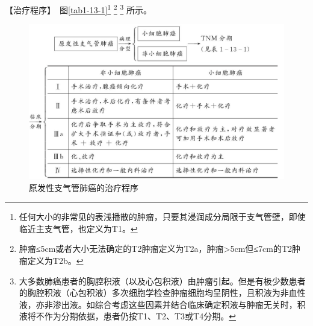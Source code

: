 【治疗程序】　图\ref{tab1-13-1}\footnote{任何大小的非常见的表浅播散的肿瘤，只要其浸润成分局限于支气管壁，即使临近主支气管，也定义为T1。}
\footnote{肿瘤≤5cm或者大小无法确定的T2肿瘤定义为T2a，肿瘤\textgreater{}5cm但≤7cm的T2肿瘤定义为T2b。}
\footnote{大多数肺癌患者的胸腔积液（以及心包积液）由肿瘤引起。但是有极少数患者的胸腔积液（心包积液）多次细胞学检查肿瘤细胞均呈阴性，且积液为非血性液，亦非渗出液。如综合考虑这些因素并结合临床确定积液与肿瘤无关时，积液将不作为分期依据，患者仍按T1、T2、T3或T4分期。}
所示。

\begin{figure}[!htbp]
 \centering
 \includegraphics{./images/Image00028.jpg}
 \captionsetup{justification=centering}
 \caption{原发性支气管肺癌的治疗程序}
 \label{fig1-13-1}
  \end{figure} 

